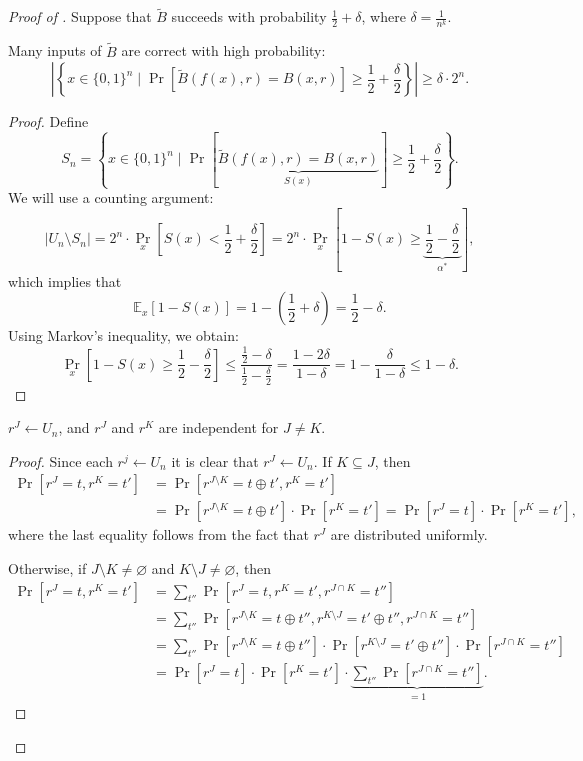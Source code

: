 \begin{proof}[Proof of ]
    Suppose that $\tilde{B}$ succeeds with probability $\frac{1}{2} + \delta$, where $\delta = \frac{1}{n^{k}}$.

	\begin{lemma}
		Many inputs of $\tilde{B}$ are correct with high probability:
		 \[
			 \left|\left\{x \in \{0,1\}^n \mid \Pr[\tilde{B}(f(x), r) = B(x, r)] \geq \frac{1}{2} + \frac{\delta}{2}\right\}\right| \geq \delta \cdot 2^n.
		\] 
	\end{lemma}

	\begin{proof}
		  Define 
		  \[
			  S_n = \left\{x \in \{0,1\}^n \mid \Pr\left[\underbrace{\tilde{B}(f(x), r) = B(x, r)}_{S(x)}\right] \geq \frac{1}{2} + \frac{\delta}{2}\right\}.
		  \] 
		  We will use a counting argument:
		\[
			|U_n \setminus S_n| = 2^{n} \cdot \Pr_x \left[S(x) < \frac{1}{2} + \frac{\delta}{2}\right] = 2^{n} \cdot \Pr_x \left[1 - S(x) \geq \underbrace{\frac{1}{2} - \frac{\delta}{2}}_{\alpha^*}\right],
		\] 
		which implies that
		\[
			\mathbb{E}_x[1 - S(x)] = 1 - \left(\frac{1}{2} + \delta\right) = \frac{1}{2} - \delta.
		\] 
		Using Markov's inequality, we obtain:
		\[
			\Pr_x \left[1 - S(x) \geq \frac{1}{2} - \frac{\delta}{2}\right] \leq \frac{\frac{1}{2} - \delta}{\frac{1}{2} - \frac{\delta}{2}} = \frac{1 - 2 \delta}{1 - \delta} = 1 - \frac{\delta}{1 - \delta} \leq 1 - \delta.
		\] 
	\end{proof}

	\begin{lemma}
		$r^J \gets U_n$, and $r^J$ and $r^K$ are independent for $J \neq K$.
	\end{lemma}

	\begin{proof}
		Since each $r^{j} \gets  U_n$ it is clear that $r^{J} \gets  U_n$.
		If $K \subseteq J$, then
		 \begin{align*}
			 \Pr[r^J = t, r^K = t'] &= \Pr[r^{J \setminus K} = t \oplus t', r^{K} = t'] \\
									&= \Pr[r^{J \setminus K} = t \oplus t'] \cdot \Pr[r^K = t'] = \Pr[r^J = t] \cdot \Pr[r^K = t'],
		 \end{align*} 
		 where the last equality follows from the fact that $r^J$ are distributed uniformly. 

		 Otherwise, if $J \setminus K \neq \varnothing$ and $K \setminus J \neq \varnothing$, then
		 \begin{align*}
			 \Pr[r^J = t, r^K = t'] &= \sum_{t''} \Pr[r^J = t, r^K = t', r^{J \cap K} = t''] \\
									&= \sum_{t''} \Pr[r^{J \setminus K} = t \oplus t'', r^{K \setminus J} = t' \oplus t'', r^{J \cap K} = t''] \\
									&= \sum_{t''} \Pr[r^{J \setminus K} = t \oplus t''] \cdot \Pr[r^{K \setminus J} = t' \oplus t''] \cdot \Pr[r^{J \cap K} = t''] \\
									&= \Pr[r^{J} = t] \cdot \Pr[r^{K} = t'] \cdot \underbrace{\sum_{t''} \Pr[r^{J \cap K} = t'']}_{=1}.
		 \end{align*}
	\end{proof}


\end{proof}
